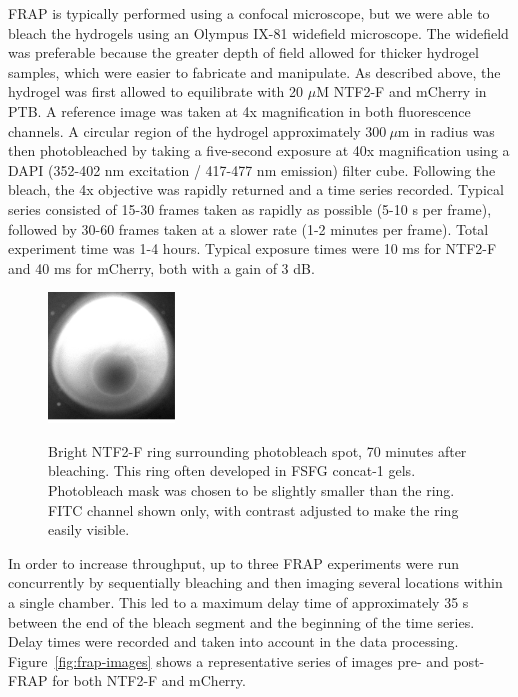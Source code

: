 FRAP is typically performed using a confocal microscope, but we were able to bleach the hydrogels using an Olympus IX-81 widefield microscope.  The widefield was preferable because the greater depth of field allowed for thicker hydrogel samples, which were easier to fabricate and manipulate.  As described above, the hydrogel was first allowed to equilibrate with 20 $\mu$M NTF2-F and mCherry in PTB.  A reference image was taken at 4x magnification in both fluorescence channels.  A circular region of the hydrogel approximately $300\ \mu$m in radius was then photobleached by taking a five-second exposure at 40x magnification using a DAPI (352-402 nm excitation / 417-477 nm emission) filter cube.  Following the bleach, the 4x objective was rapidly returned and a time series recorded.  Typical series consisted of 15-30 frames taken as rapidly as possible (5-10 s per frame), followed by 30-60 frames taken at a slower rate (1-2 minutes per frame).  Total experiment time was 1-4 hours.  Typical exposure times were 10 ms for NTF2-F and 40 ms for mCherry, both with a gain of 3 dB.

\begin{figure}
\caption[Bright NTF2-F ring surrounding photobleach spot.]{Bright NTF2-F ring surrounding photobleach spot, 70 minutes after bleaching.  This ring often developed in FSFG concat-1 gels.  Photobleach mask was chosen to be slightly smaller than the ring.  FITC channel shown only, with contrast adjusted to make the ring easily visible.}
\centering
\includegraphics[width=0.3\textwidth]{figs/ch04/ring}
\label{fig:ring}
\end{figure} 

In order to increase throughput, up to three FRAP experiments were run concurrently by sequentially bleaching and then imaging several locations within a single chamber.  This led to a maximum delay time of approximately 35 s between the end of the bleach segment and the beginning of the time series.  Delay times were recorded and taken into account in the data processing. Figure~\ref{fig:frap-images} shows a representative series of images pre- and post-FRAP for both NTF2-F and mCherry.

